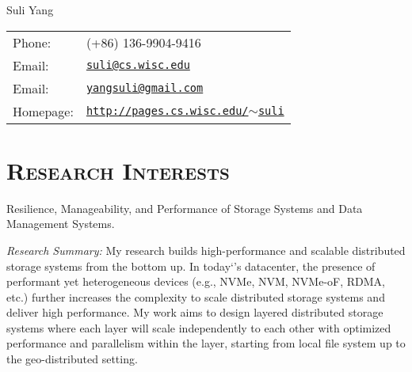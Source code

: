 \documentclass[10pt, letterpaper]{article}
\def\name{Suli Yang}
\begin{document}
{\huge \name}

\bigskip

\begin{minipage}{0.45\linewidth}
\hypersetup{urlcolor=black}
\begin{tabular}{ll}
  Phone: & (+86) 136-9904-9416\\
  Email: & \href{mailto:suli@cs.wisc.edu}{\tt suli@cs.wisc.edu}\\
  Email: & \href{mailto:yangsuli@gmail.com}{\tt yangsuli@gmail.com}\\
  Homepage: & \href{http://pages.cs.wisc.edu/~suli}
  	{\tt http://pages.cs.wisc.edu/$\sim$suli}
\end{tabular}
\end{minipage}

\section*{\textsc{Research Interests}}

Resilience, Manageability, and Performance of Storage Systems and Data Management Systems.


\vspace{0.15cm}
\noindent
{\textit{Research Summary:}} 
    My research builds high-performance and scalable distributed storage systems from the bottom up. 
    In today`’s datacenter, the presence of performant yet heterogeneous devices (e.g., NVMe, NVM, NVMe-oF, RDMA, etc.) further increases the complexity to scale distributed storage systems and deliver high performance. My work aims to design layered distributed storage systems where each layer will scale independently to each other with optimized performance and parallelism within the layer, starting from local file system up to the geo-distributed setting. 
    
\fi
\end{document}
